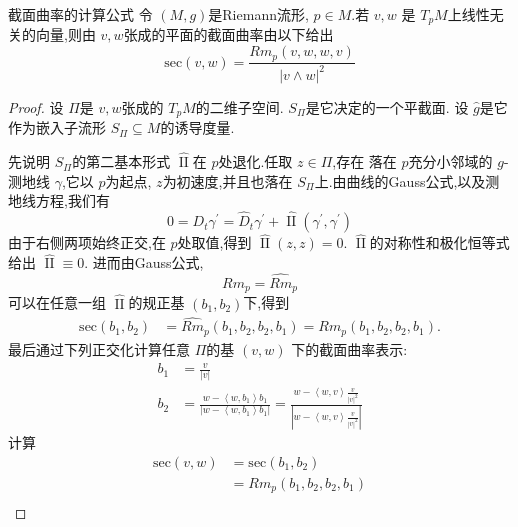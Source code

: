 \documentclass[../../几何与拓扑.tex]{subfiles}
\begin{document}
\begin{proposition}{截面曲率的计算公式}
    令 \(  \left( M,g \right)   \)是Riemann流形, \(  p \in M  \).若 \(  v,w  \)   是 \(  T_{p}M  \)上线性无关的向量,则由  \(  v,w  \)张成的平面的截面曲率由以下给出 \[
    \mathrm{sec}\left( v,w \right)=  \frac{Rm_{p}\left( v,w,w,v \right)  }{\left| v\wedge w \right|^{2}  }  
    \]  
\end{proposition}

\begin{proof}
    设 \(  \Pi   \)是 \(  v,w  \)张成的 \(  T_{p}M  \)的二维子空间. \(  S_{\Pi }  \)是它决定的一个平截面.    设 \(  \hat{g}  \)是它作为嵌入子流形 \(  S_{\Pi }\subseteq M  \)的诱导度量.  

    先说明 \(  S_{\Pi }  \)的第二基本形式 \(  \hat{\operatorname{II} }  \)在 \(  p  \)处退化.任取 \(  z \in \Pi   \),存在 落在 \(  p  \)充分小邻域的 \(  g  \)-测地线 \(   \gamma   \),它以 \(  p  \)为起点, \(  z  \)为初速度,并且也落在 \(  S_{\Pi }  \)上.由曲线的Gauss公式,以及测地线方程,我们有 \[
    0 =  D_{t} \gamma ^{\prime} =  \hat{D}_{t} \gamma ^{\prime} + \hat{\operatorname{II} }\left(  \gamma ^{\prime} , \gamma ^{\prime}  \right) 
    \]            由于右侧两项始终正交,在 \(  p  \)处取值,得到 \(  \hat{\operatorname{II}} \left( z,z \right)= 0   \).  \(  \hat{\operatorname{II} }  \)的对称性和极化恒等式给出 \(  \hat{\operatorname{II}}\equiv 0  \).   进而由Gauss公式, \[
    Rm_{p}=  \hat{Rm}_{p}
    \]可以在任意一组 \(  \hat{\operatorname{II}}  \)的规正基 \(  \left( b_1,b_2 \right)   \)下,得到 \[
    \begin{aligned}
        \mathrm{sec}\left( b_1,b_2 \right)&= \hat{Rm}_{p}\left( b_1,b_2,b_2,b_1 \right)=  Rm_{p}\left( b_1,b_2,b_2,b_1 \right).   
    \end{aligned} 
    \]  
    最后通过下列正交化计算任意 \(  \Pi   \)的基  \(  \left( v,w \right)   \)  下的截面曲率表示: \[
    \begin{aligned}
    b_1&=  \frac{v }{\left| v \right|  }  \\ 
     b_2&= \frac{w- \left<w,b_1 \right>  b_1}{\left| w-\left<w,b_1 \right> b_1\right|  }=   \frac{w- \left<w,v \right> \frac{v }{\left| v \right| ^{2} }  }{\left| w-\left<w,v \right> \frac{v }{\left| v \right|^{2}  } \right|  } 
    \end{aligned}
    \]计算 \[
    \begin{aligned}
    \mathrm{sec}\left( v,w \right)&= \mathrm{sec}\left( b_1,b_2 \right)\\ 
     &=   Rm_{p}\left( b_1,b_2,b_2,b_1 \right)\\ 

\end{aligned}\]
\end{proof}
\end{document}
